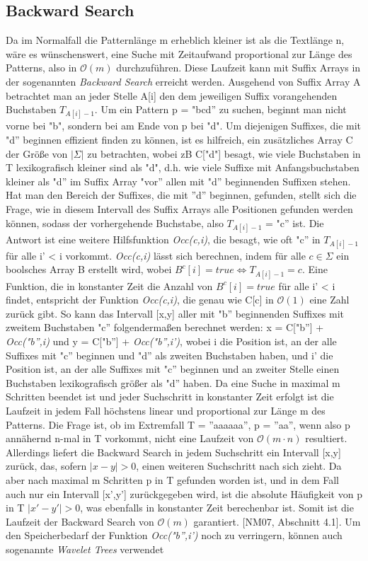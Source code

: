 \documentclass[12pt,twoside]{article}
\begin{document}
\subsection{Backward Search}
Da im Normalfall die Patternlänge m erheblich kleiner ist als die Textlänge n, wäre es wünschenswert, eine Suche mit Zeitaufwand proportional zur Länge des Patterns, also in $\mathcal{O}(m)$ durchzuführen. Diese Laufzeit kann mit Suffix Arrays in der sogenannten \textit{Backward Search} erreicht werden. Ausgehend von Suffix Array A betrachtet man an jeder Stelle A[i] den dem jeweiligen Suffix vorangehenden Buchstaben $T_{A[i]-1}$. Um ein Pattern p = "bcd'' zu suchen, beginnt man nicht vorne bei "b", sondern bei am Ende von p bei "d". Um diejenigen Suffixes, die mit "d'' beginnen effizient finden zu können, ist es hilfreich, ein zusätzliches Array C der Größe von $\vert \Sigma \vert$ zu betrachten, wobei zB C["d"] besagt, wie viele Buchstaben in T lexikografisch kleiner sind als "d", d.h. wie viele Suffixe mit Anfangsbuchstaben kleiner als "d'' im Suffix Array "vor'' allen mit "d'' beginnenden Suffixen stehen. Hat man den Bereich der Suffixes, die mit ''d'' beginnen, gefunden, stellt sich die Frage, wie in diesem Intervall des Suffix Arrays alle Positionen gefunden werden können, sodass der vorhergehende Buchstabe, also $T_{A[i]-1}$ = "c'' ist. Die Antwort ist eine weitere Hilfsfunktion \textit{Occ(c,i)}, die besagt, wie oft "c'' in $T_{A[i]-1}$ für alle i' < i vorkommt. \textit{Occ(c,i)} lässt sich berechnen, indem für alle $c \in \Sigma$ ein boolsches Array B erstellt wird, wobei $B^{c}[i] = true \Leftrightarrow T_{A[i]-1} = c$. Eine Funktion, die in konstanter Zeit die Anzahl von $B^{c}[i] = true$ für alle i' < i findet, entspricht der Funktion \textit{Occ(c,i)}, die genau wie C[c] in $\mathcal{O}(1)$ eine Zahl zurück gibt. So kann das Intervall [x,y] aller mit "b'' beginnenden Suffixes mit zweitem Buchstaben "c'' folgendermaßen berechnet werden: x = C["b''] + \textit{Occ("b'',i)} und y = C["b''] + \textit{Occ("b'',i')}, wobei i die Position ist, an der alle Suffixes mit "c'' beginnen und "d'' als zweiten Buchstaben haben, und i' die Position ist, an der alle Suffixes mit "c'' beginnen und an zweiter Stelle einen Buchstaben lexikografisch größer als "d'' haben. Da eine Suche in maximal m Schritten beendet ist und jeder Suchschritt in konstanter Zeit erfolgt ist die Laufzeit in jedem Fall höchstens linear und proportional zur Länge m des Patterns. Die Frage ist, ob im Extremfall T = ''aaaaaa'', p = ''aa'', wenn also p annähernd n-mal in T vorkommt, nicht eine Laufzeit von $\mathcal{O}(m \cdot n)$ resultiert. Allerdings liefert die Backward Search in jedem Suchschritt ein Intervall [x,y] zurück, das, sofern $\vert x-y \vert > 0$, einen weiteren Suchschritt nach sich zieht. Da aber nach maximal m Schritten p in T gefunden worden ist, und in dem Fall auch nur ein Intervall [x',y'] zurückgegeben wird, ist die absolute Häufigkeit von p in T $\vert x'-y' \vert > 0$, was ebenfalls in konstanter Zeit berechenbar ist. Somit ist die Laufzeit der Backward Search von $\mathcal{O}(m)$ garantiert. [NM07, Abschnitt 4.1]. Um den Speicherbedarf der Funktion \textit{Occ("b'',i')} noch zu verringern, können auch sogenannte \textit{Wavelet Trees} verwendet 
\end{document}
